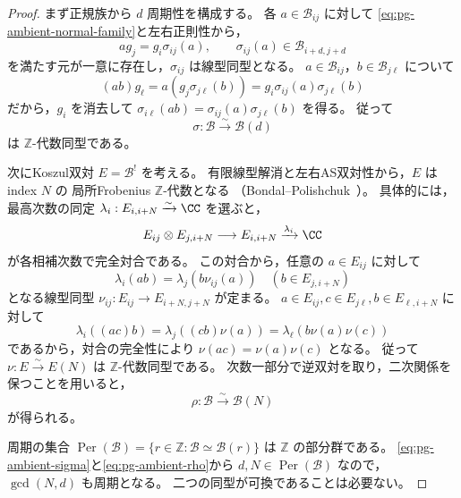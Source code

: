 \begin{proof}
まず正規族から $d$ 周期性を構成する。
各 $a\in\mathcal B_{ij}$ に対して
\eqref{eq:pg-ambient-normal-family}と左右正則性から，
\begin{equation}
 ag_j=g_i\sigma_{ij}(a),\qquad
 \sigma_{ij}(a)\in\mathcal B_{i+d,j+d}
\end{equation}
を満たす元が一意に存在し，$\sigma_{ij}$ は線型同型となる。
$a\in\mathcal B_{ij}$，$b\in\mathcal B_{j\ell}$ について
\begin{equation}
 (ab)g_\ell
 =a(g_j\sigma_{j\ell}(b))
 =g_i\sigma_{ij}(a)\sigma_{j\ell}(b)
\end{equation}
だから，$g_i$ を消去して
$\sigma_{i\ell}(ab)=\sigma_{ij}(a)\sigma_{j\ell}(b)$ を得る。
従って
\begin{equation}\label{eq:pg-ambient-sigma}
 \sigma:\mathcal B\xrightarrow{\sim}\mathcal B(d)
\end{equation}
は $\mathbb Z$-代数同型である。

次にKoszul双対 $E=\mathcal B^!$ を考える。
有限線型解消と左右AS双対性から，$E$ はindex $N$ の
局所Frobenius $\mathbb Z$-代数となる
（Bondal--Polishchuk~\cite[Proposition~4.1, \S5]{PBondalPolishchukHelices}）。
具体的には，最高次数の同定
$\lambda_i:E_{i,i+N}\xrightarrow{\sim}\CC$ を選ぶと，
\begin{equation}
 E_{ij}\otimes E_{j,i+N}\longrightarrow E_{i,i+N}
 \xrightarrow{\lambda_i}\CC
\end{equation}
が各相補次数で完全対合である。
この対合から，任意の $a\in E_{ij}$ に対して
\begin{equation}
 \lambda_i(ab)=\lambda_j(b\nu_{ij}(a))
 \quad(b\in E_{j,i+N})
\end{equation}
となる線型同型 $\nu_{ij}:E_{ij}\to E_{i+N,j+N}$ が定まる。
$a\in E_{ij},c\in E_{j\ell},b\in E_{\ell,i+N}$ に対して
\begin{equation}
 \lambda_i((ac)b)
 =\lambda_j((cb)\nu(a))
 =\lambda_\ell(b\nu(a)\nu(c))
\end{equation}
であるから，対合の完全性により
$\nu(ac)=\nu(a)\nu(c)$ となる。
従って $\nu:E\xrightarrow{\sim}E(N)$ は $\mathbb Z$-代数同型である。
次数一部分で逆双対を取り，二次関係を保つことを用いると，
\begin{equation}\label{eq:pg-ambient-rho}
 \rho:\mathcal B\xrightarrow{\sim}\mathcal B(N)
\end{equation}
が得られる。

周期の集合
$\operatorname{Per}(\mathcal B)=
\{r\in\mathbb Z:\mathcal B\simeq\mathcal B(r)\}$
は $\mathbb Z$ の部分群である。
\eqref{eq:pg-ambient-sigma}と\eqref{eq:pg-ambient-rho}から
$d,N\in\operatorname{Per}(\mathcal B)$ なので，
$\gcd(N,d)$ も周期となる。
二つの同型が可換であることは必要ない。
\end{proof}

